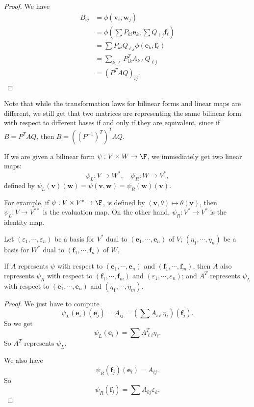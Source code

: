 \documentclass[a4paper]{article}
\begin{document}
\begin{proof}
  We have
  \begin{align*}
    B_{ij} &= \phi(\mathbf{v}_i, \mathbf{w}_j)\\
    &= \phi\left(\sum P_{ki}\mathbf{e}_k, \sum Q_{\ell j}\mathbf{f}_\ell\right)\\
    &= \sum P_{ki}Q_{\ell j}\phi(\mathbf{e}_k, \mathbf{f}_\ell)\\
    &= \sum_{k, \ell} P^T_{ik} A_{k\ell} Q_{\ell j}\\
    &= (P^T AQ)_{ij}.
  \end{align*}
\end{proof}
Note that while the transformation laws for bilinear forms and linear maps are different, we still get that two matrices are representing the same bilinear form with respect to different bases if and only if they are equivalent, since if $B = P^T AQ$, then $B = ((P^{-1})^T)^T AQ$.

If we are given a bilinear form $\psi: V\times W \to \F$, we immediately get two linear maps:
\[
  \psi_L: V\to W^*,\quad \psi_R: W \to V^*,
\]
defined by $\psi_L(\mathbf{v})(\mathbf{w}) = \psi(\mathbf{v}, \mathbf{w}) = \psi_R(\mathbf{w})(\mathbf{v})$.

For example, if $\psi: V\times V^* \to \F$, is defined by $(\mathbf{v}, \theta) \mapsto \theta(\mathbf{v})$, then $\psi_L: V\to V^{**}$ is the evaluation map. On the other hand, $\psi_R: V^* \to V^*$ is the identity map.

\begin{lemma}
  Let $(\varepsilon_1,\cdots, \varepsilon_n)$ be a basis for $V^*$ dual to $(\mathbf{e}_1, \cdots, \mathbf{e}_n)$ of $V$; $(\eta_1,\cdots, \eta_n)$ be a basis for $W^*$ dual to $(\mathbf{f}_1, \cdots, \mathbf{f}_n)$ of $W$.

  If $A$ represents $\psi$ with respect to $(\mathbf{e}_1, \cdots, \mathbf{e}_n)$ and $(\mathbf{f}_1, \cdots, \mathbf{f}_m)$, then $A$ also represents $\psi_R$ with respect to $(\mathbf{f}_1,\cdots, \mathbf{f}_m)$ and $(\varepsilon_1, \cdots, \varepsilon_n)$; and $A^T$ represents $\psi_L$ with respect to $(\mathbf{e}_1, \cdots, \mathbf{e}_n)$ and $(\eta_1, \cdots, \eta_m)$.
\end{lemma}

\begin{proof}
  We just have to compute
  \[
    \psi_L(\mathbf{e}_i)(\mathbf{e}_j) = A_{ij} = \left(\sum A_{i\ell} \eta_\ell\right) (\mathbf{f}_j).
  \]
  So we get
  \[
    \psi_L(\mathbf{e}_i) = \sum A_{\ell i}^T\eta_\ell.
  \]
  So $A^T$ represents $\psi_L$.

  We also have
  \[
    \psi_R(\mathbf{f}_j)(\mathbf{e}_i) = A_{ij}.
  \]
  So
  \[
    \psi_R(\mathbf{f}_j) = \sum A_{kj}\varepsilon_k.
  \]
\end{proof}
\end{document}
